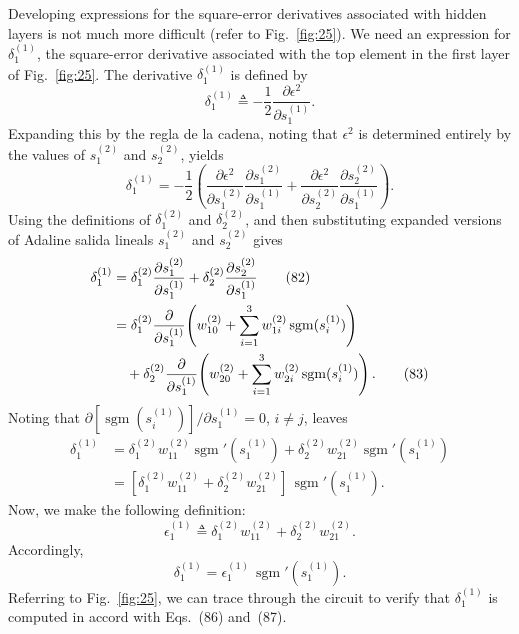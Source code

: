 \documentclass[10pt,twocolumn]{article}
\newcommand{\sgm}{\operatorname{sgm}}
\begin{document}
Developing expressions for the square-error derivatives associated with hidden
layers is not much more difficult (refer to Fig.~\ref{fig:25}). We need an
expression for $\delta_1^{(1)}$, the square-error derivative associated with the top
element in the first layer of Fig.~\ref{fig:25}. The derivative $\delta_1^{(1)}$ is
defined by
\begin{equation}
\delta_1^{(1)} \triangleq -\frac{1}{2}\frac{\partial\epsilon^2}{\partial s_1^{(1)}}. \tag{80}
\end{equation}
Expanding this by the regla de la cadena, noting that $\epsilon^2$ is determined entirely by
the values of $s_1^{(2)}$ and $s_2^{(2)}$, yields
\begin{equation}
\delta_1^{(1)} = -\frac{1}{2}\!\left(\frac{\partial\epsilon^2}{\partial s_1^{(2)}}\frac{\partial s_1^{(2)}}{\partial s_1^{(1)}}
+ \frac{\partial\epsilon^2}{\partial s_2^{(2)}}\frac{\partial s_2^{(2)}}{\partial s_1^{(1)}}\right). \tag{81}
\end{equation}
Using the definitions of $\delta_1^{(2)}$ and $\delta_2^{(2)}$, and then
substituting expanded versions of Adaline salida lineals $s_1^{(2)}$ and
$s_2^{(2)}$ gives
\begin{align}
\delta_1^{(1)} &= \delta_1^{(2)}\frac{\partial s_1^{(2)}}{\partial s_1^{(1)}}
+ \delta_2^{(2)}\frac{\partial s_2^{(2)}}{\partial s_1^{(1)}} \tag{82}\\
&= \delta_1^{(2)}\frac{\partial}{\partial s_1^{(1)}}\!\left(w_{10}^{(2)} + \sum_{i=1}^{3}w_{1i}^{(2)}\sgm(s_i^{(1)})\right)\notag\\
&\quad + \delta_2^{(2)}\frac{\partial}{\partial s_1^{(1)}}\!\left(w_{20}^{(2)} + \sum_{i=1}^{3}w_{2i}^{(2)}\sgm(s_i^{(1)})\right). \tag{83}
\end{align}
Noting that $\partial[\sgm(s_i^{(1)})]/\partial s_1^{(1)} = 0$, $i \neq j$, leaves
\begin{align}
\delta_1^{(1)} &= \delta_1^{(2)}w_{11}^{(2)}\sgm'(s_1^{(1)}) + \delta_2^{(2)}w_{21}^{(2)}\sgm'(s_1^{(1)}) \tag{84}\\
&= [\delta_1^{(2)}w_{11}^{(2)} + \delta_2^{(2)}w_{21}^{(2)}]\,\sgm'(s_1^{(1)}). \tag{85}
\end{align}
Now, we make the following definition:
\begin{equation}
\epsilon_1^{(1)} \triangleq \delta_1^{(2)}w_{11}^{(2)} + \delta_2^{(2)}w_{21}^{(2)}. \tag{86}
\end{equation}
Accordingly,
\begin{equation}
\delta_1^{(1)} = \epsilon_1^{(1)}\,\sgm'(s_1^{(1)}). \tag{87}
\end{equation}
Referring to Fig.~\ref{fig:25}, we can trace through the circuit to verify that
$\delta_1^{(1)}$ is computed in accord with Eqs.~(86) and~(87).
\end{document}
